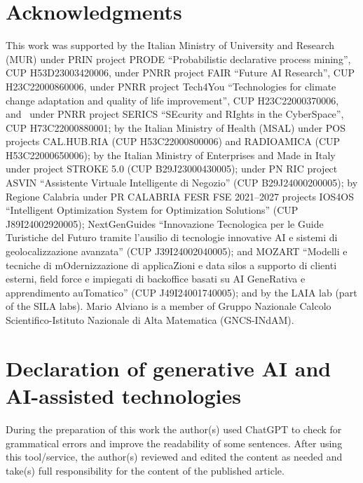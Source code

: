 \documentclass[preprint,authoryear]{elsarticle}
\theoremstyle{definition}
\begin{document}
\section*{Acknowledgments}
This work was supported by the Italian Ministry of University and Research (MUR) 
    under PRIN project PRODE ``Probabilistic declarative process mining'', CUP H53D23003420006,
    under PNRR project FAIR ``Future AI Research'', CUP H23C22000860006,
    under PNRR project Tech4You ``Technologies for climate change adaptation and quality of life improvement'', CUP H23C22000370006, and~
    under PNRR project SERICS ``SEcurity and RIghts in the CyberSpace'', CUP H73C22000880001;
by the Italian Ministry of Health (MSAL)
    under POS projects CAL.HUB.RIA (CUP H53C22000800006) and RADIOAMICA (CUP H53C22000650006);
by the Italian Ministry of Enterprises and Made in Italy
    under project STROKE 5.0 (CUP B29J23000430005);
    under PN RIC project ASVIN ``Assistente Virtuale Intelligente di Negozio'' (CUP B29J24000200005);
by Regione Calabria
    under PR CALABRIA FESR FSE 2021–2027 projects
    IOS4OS ``Intelligent Optimization System for Optimization Solutions'' (CUP J89I24002920005);
    NextGenGuides ``Innovazione Tecnologica per le Guide Turistiche del Futuro tramite l'ausilio di tecnologie innovative AI e sistemi di geolocalizzazione avanzata'' (CUP J39I24002040005);
    and MOZART ``Modelli e tecniche di mOdernizzazione di applicaZioni e data silos a supporto di clienti esterni, field force e impiegati di backoffice basati su AI GeneRativa e apprendimento auTomatico'' (CUP J49I24001740005);
and by the LAIA lab (part of the SILA labs). 
Mario Alviano is a member of Gruppo Nazionale Calcolo Scientifico-Istituto Nazionale di Alta Matematica (GNCS-INdAM).

    \section*{Declaration of generative AI and AI-assisted technologies}
    During the preparation of this work the author(s) used ChatGPT to check for grammatical errors and improve the readability of some sentences. After using this tool/service, the author(s) reviewed and edited the content as needed and take(s) full responsibility for the content of the published article.



\end{document}
